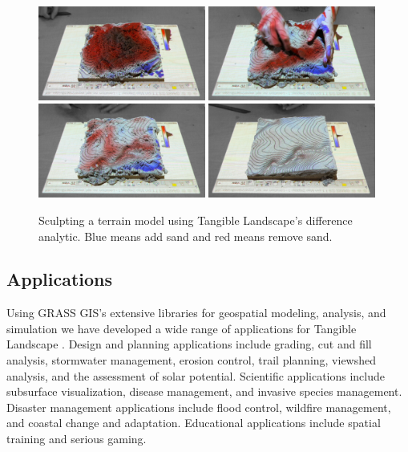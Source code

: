 \documentclass[prodmode,acmtochi]{acmsmall} %
\begin{document}
\begin{figure}
\begin{center}
		\includegraphics[width=0.49\textwidth]{images/difference/tl_difference_1.jpg}
		\includegraphics[width=0.49\textwidth]{images/difference/tl_difference_2.jpg}\vspace*{0.2em}
		\includegraphics[width=0.49\textwidth]{images/difference/tl_difference_3.jpg}
		\includegraphics[width=0.49\textwidth]{images/difference/tl_difference_4.jpg}
	\caption{Sculpting a terrain model using Tangible Landscape's difference analytic.
	Blue means add sand and red means remove sand.
	}
	\label{fig:difference_sequence}
\end{center}
\end{figure}

\subsection{Applications}
Using GRASS GIS's extensive libraries for 
geospatial modeling, analysis, and simulation 
we have developed a wide range of applications for Tangible Landscape 
\cite{Petrasova2015}.
Design and planning applications include
grading, cut and fill analysis, stormwater management, erosion control, 
trail planning, viewshed analysis, and the assessment of solar potential. 
Scientific applications include
subsurface visualization, disease management, and invasive species management.
Disaster management applications include 
flood control, wildfire management, and coastal change and adaptation. 
Educational applications include
spatial training and serious gaming.
\end{document}
